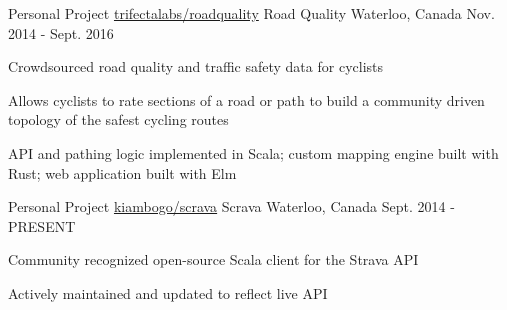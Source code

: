 \begin{cventries}
  \cventry
  {Personal Project \hspace{1mm} \href{https://github.com/trifectalabs/roadquality}{\faGithubSquare \hspace{0.5mm} trifectalabs/roadquality}}
    {Road Quality}
    {Waterloo, Canada}
    {Nov. 2014 - Sept. 2016}
    {
      \begin{cvitems}
        \item {Crowdsourced road quality and traffic safety data for cyclists}
        \item {Allows cyclists to rate sections of a road or path to build a
            community driven topology of the safest cycling routes}
        \item {API and pathing logic implemented in Scala; custom mapping engine built with Rust; web application built with
          Elm}
      \end{cvitems}
    }
  \cventry
  {Personal Project \hspace{1mm} \href{https://github.com/kiambogo/scrava}{\faGithubSquare \hspace{0.5mm} kiambogo/scrava}}
    {Scrava}
    {Waterloo, Canada}
    {Sept. 2014 - PRESENT}
    {
      \begin{cvitems}
        \item {Community recognized open-source Scala client for the Strava API}
        \item {Actively maintained and updated to reflect live API}
      \end{cvitems}
    }
\end{cventries}
